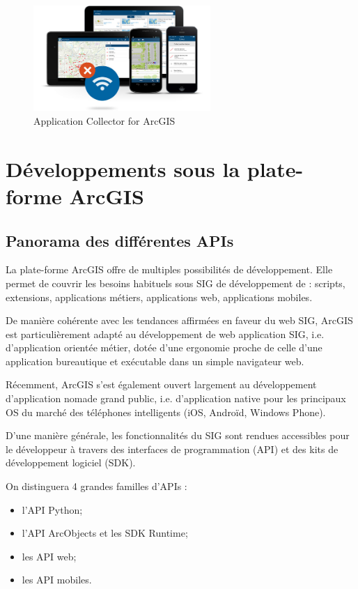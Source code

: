 \documentclass[11pt]{article}
\begin{document}
\begin{figure}[H]
	\center \includegraphics[width=0.6\textwidth]{img/cours/collector_for_arcgis.jpg}
	\caption{Application Collector for ArcGIS}
\end{figure}

\newpage



\section{Développements sous la plate-forme ArcGIS}

\subsection{Panorama des différentes APIs}
La plate-forme ArcGIS offre de multiples possibilités de développement. Elle permet de couvrir les besoins habituels sous SIG de développement de : scripts, extensions, applications métiers, applications web, applications mobiles.

De manière cohérente avec les tendances affirmées en faveur du web SIG, ArcGIS est particulièrement adapté au développement de web application SIG, i.e. d'application orientée métier, dotée d'une ergonomie proche de celle d'une application bureautique et exécutable dans un simple navigateur web.

Récemment, ArcGIS s'est également ouvert largement au développement d'application nomade grand public, i.e. d'application native pour les principaux OS du marché des téléphones intelligents (iOS, Androïd, Windows Phone).

D'une manière générale, les fonctionnalités du SIG sont rendues accessibles pour le développeur à travers des interfaces de programmation (API) et des kits de développement logiciel (SDK).

On distinguera 4 grandes familles d'APIs :
\begin{itemize}
	\item l'API Python;
	\item l'API ArcObjects et les SDK Runtime;
	\item les API web;
	\item les API mobiles.
\end{itemize}
\end{document}
